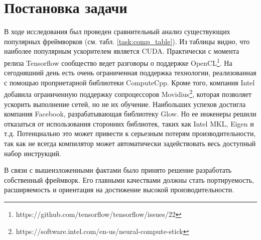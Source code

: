 \clearpage
\section{Постановка задачи}
В ходе исследования был проведен сравнительный анализ существующих популярных фреймворков (см. табл. \ref{task:comp_table}). Из таблицы видно, что наиболее популярным ускорителем является CUDA. Практически с момента релиза Tensorflow сообщество ведет разговоры о поддержке OpenCL\footnote{https://github.com/tensorflow/tensorflow/issues/22}. На сегодняшний день есть очень ограниченная поддержка технологии, реализованная с помощью проприетарной библиотеки ComputeCpp. Кроме того, компания Intel добавила ограниченную поддержку сопроцессоров Movidius\footnote{https://software.intel.com/en-us/neural-compute-stick}, которая позволяет ускорить выполнение сетей, но не их обучение. Наибольших успехов достигла компания Facebook, разрабатывающая библиотеку Glow. Но ее инженеры решили отказаться от использования сторонних библиотек, таких как Intel MKL, Eigen и т.д. Потенциально это может привести к серьезным потерям производительности, так как не всегда компилятор может автоматически задействовать весь доступный набор инструкций.
\par
В связи с вышеизложенными фактами было принято решение разработать собственный фреймворк. Его главными качествами должны стать портируемость, расширяемость и ориентация на достижение высокой производительности.
\par

